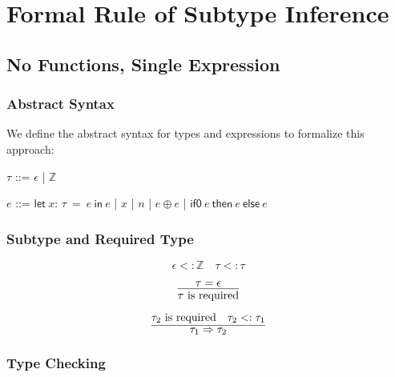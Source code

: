 \documentclass[10pt,conference]{IEEEtran}
\newcommand{\Z}{\ensuremath{\mathbb{Z}}}
\newcommand{\lett}[4]{\ensuremath{\mathsf{let}\ #1\mathsf{:}\,#2\ \mathsf{=}\ #3\ \mathsf{in}\ #4}}
\newcommand{\binop}[2]{\ensuremath{#1\ \mathsf{\oplus}\ #2}}
\newcommand{\ternary}[3]{\ensuremath{\mathsf{if0}\ #1\ \mathsf{then}\ #2\ \mathsf{else}\ #3}}
\begin{document}
\section{Formal Rule of Subtype Inference}

\subsection{No Functions, Single Expression}
\subsubsection{Abstract Syntax}
We define the abstract syntax for types and expressions to formalize this approach:

\vspace{1em}

\begin{bnf}
    $\tau$ ::= $\epsilon$ | $\Z$
\end{bnf}

\begin{bnf}
    $e$ ::= \lett{x}{\tau}{e}{e}
    | $x$
    | $n$
    | \binop{e}{e}
    | \ternary{e}{e}{e}
\end{bnf}

\vspace{1em}

\subsubsection{Subtype and Required Type}

\newcommand{\required}[1]{\ensuremath{#1\text{ is required}}}
\newcommand{\nrequired}[1]{\ensuremath{#1\text{ is not required}}}
\newcommand{\forcerequire}[2]{\ensuremath{#1\Rightarrow#2}}

\[
    \epsilon <: \Z \quad \tau <: \tau
\]

\[
    \infer{
        \required{\tau}
    }{\tau=\epsilon}
\]

\[
    \infer{
        \forcerequire{\tau_1}{\tau_2}
    }{\required{\tau_2} \quad \tau_2 <: \tau_1}
\]

\subsubsection{Type Checking}
\newcommand{\checkrule}[4]{\[\infer{\checktype{\Gamma}{#1}{#2}{#3}}{
    \begin{array}{c}
        #4
    \end{array}
}\]}
\end{document}
